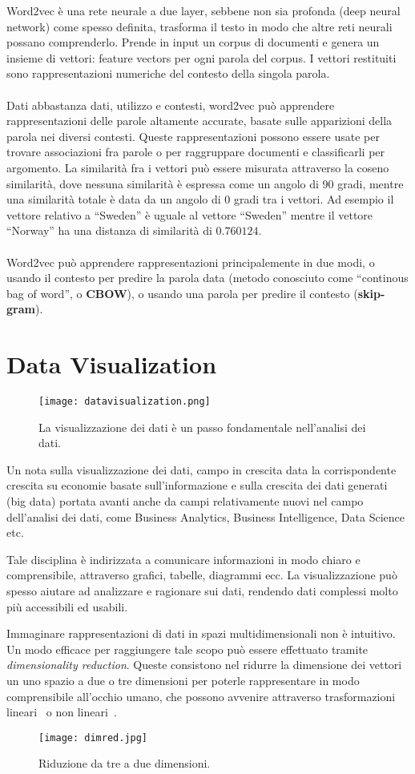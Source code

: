 Word2vec è una rete neurale a due layer, sebbene non sia profonda (deep neural network) come spesso definita, trasforma il testo in modo che altre reti neurali possano comprenderlo. Prende in input un corpus di documenti e genera un insieme di vettori: feature vectors per ogni parola del corpus. I vettori restituiti sono rappresentazioni numeriche del contesto della singola parola. 
\\\\
Dati abbastanza dati, utilizzo e contesti, word2vec può apprendere rappresentazioni delle parole altamente accurate, basate sulle apparizioni della parola nei diversi contesti. Queste rappresentazioni possono essere usate per trovare associazioni fra parole o per raggruppare documenti e classificarli per argomento. La similarità fra i vettori può essere misurata attraverso la coseno similarità, dove nessuna similarità è espressa come un angolo di 90 gradi, mentre una similarità totale è data  da un angolo di 0 gradi tra i vettori. Ad esempio il vettore relativo a “Sweden” è uguale al vettore “Sweden” mentre il vettore “Norway” ha una distanza di similarità di $0.760124$.
\\\\
Word2vec può apprendere rappresentazioni principalemente in due modi, o usando il contesto per predire la parola data (metodo conosciuto come “continous bag of word”, o \textbf{CBOW}), o usando una parola per predire il contesto (\textbf{skip-gram}).

\section{Data Visualization}
\begin{figure}[h!]
	\centering
	\texttt{[image: datavisualization.png]}
	\caption{La visualizzazione dei dati è un passo fondamentale nell'analisi dei dati.}
	\label{datavisualization}
\end{figure}
Un nota sulla visualizzazione dei dati, campo in crescita data la corrispondente crescita su economie basate sull’informazione e sulla crescita dei dati generati (big data) portata avanti anche da campi relativamente nuovi nel campo dell’analisi dei dati, come Business Analytics, Business Intelligence, Data Science etc.

Tale disciplina è indirizzata a comunicare informazioni in modo chiaro e comprensibile, attraverso grafici, tabelle, diagrammi ecc. La visualizzazione può spesso aiutare ad analizzare e ragionare sui dati, rendendo dati complessi molto più accessibili ed usabili.

Immaginare rappresentazioni di dati in spazi multidimensionali non è intuitivo. Un modo efficace per raggiungere tale scopo può essere effettuato tramite \textit{dimensionality reduction}. Queste consistono nel ridurre la dimensione dei vettori un uno spazio a due o tre dimensioni per poterle rappresentare in modo comprensibile all'occhio umano, che possono avvenire attraverso trasformazioni lineari~\cite{PCA} o non lineari~\cite{vandermaaten08}.
\begin{figure}[htb]
	\centering
	\texttt{[image: dimred.jpg]}
	\caption{Riduzione da tre a due dimensioni.}
	\label{datavisualization}
\end{figure}
